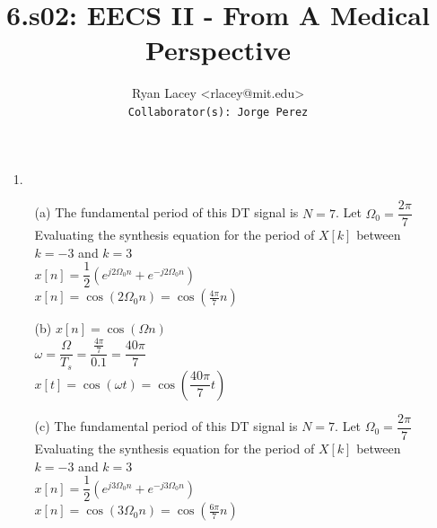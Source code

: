 \documentclass{article}
\begin{document}

\title{6.s02: EECS II - From A Medical Perspective}
\author{
  Ryan Lacey <rlacey@mit.edu>\\
  \footnotesize \texttt{Collaborator(s): Jorge Perez}
}
        
\maketitle
        


\begin{enumerate}
\item[1.]
	\begin{enumerate}
	\item[(a)]
		The fundamental period of this DT signal is $N=7$. Let $\Omega_0 = \dfrac{2\pi}{7}$\\
		
		Evaluating the synthesis equation for the period of $X[k]$ between $k=-3$ and $k=3$\\
		
		$x[n] = \dfrac{1}{2}\left(e^{j2\Omega_{0}n} + e^{-j2\Omega_{0}n}\right)$\\
		
		$x[n] = \cos\left(2\Omega_{0}n\right) = \cos\left(\frac{4\pi}{7}n\right)$

\bigskip

	\item[(b)]
		$x[n] = \cos\left(\Omega n\right)$\\
		
		$\omega = \dfrac{\Omega}{T_{s}} = \dfrac{\frac{4\pi}{7}}{0.1} = \dfrac{40\pi}{7}$\\
		
		$x[t] = \cos\left(\omega t\right) = \cos\left(\dfrac{40\pi}{7} t\right) $

\bigskip

	\item[(c)]
		The fundamental period of this DT signal is $N=7$. Let $\Omega_0 = \dfrac{2\pi}{7}$\\
		
		Evaluating the synthesis equation for the period of $X[k]$ between $k=-3$ and $k=3$\\
		
		$x[n] = \dfrac{1}{2}\left(e^{j3\Omega_{0}n} + e^{-j3\Omega_{0}n}\right)$\\
		
		$x[n] = \cos\left(3\Omega_{0}n\right) = \cos\left(\frac{6\pi}{7}n\right)$


\end{enumerate}
\end{enumerate}
\end{document}
